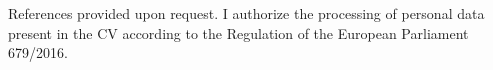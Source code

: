 \documentclass[hipsterpaolo]{simplehipstercv}
\begin{document}
\begin{paracol}{2}
{


\setlength{\parindent}{0pt}

\fontfamily{\sfdefault}\selectfont \color{black!70}
{
    References provided upon request.\newline
    I authorize the processing of personal data present in the CV according to the Regulation of the European Parliament 679/2016.
}
}
\end{paracol}
\end{document}
